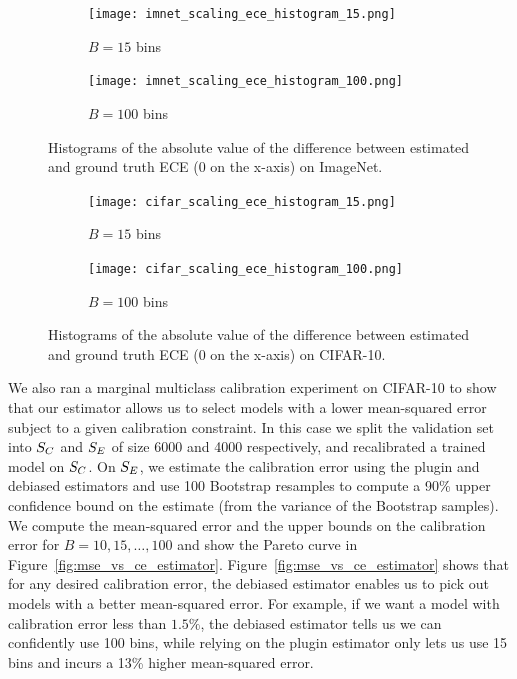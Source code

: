 \begin{figure}
  \centering
  \centering
     \begin{subfigure}[b]{0.45\textwidth}
         \centering
         \texttt{[image: imnet\_scaling\_ece\_histogram\_15.png]}
         \caption{$B = 15$ bins}
     \end{subfigure}
     \hfill
     \begin{subfigure}[b]{0.45\textwidth}
         \centering
         \texttt{[image: imnet\_scaling\_ece\_histogram\_100.png]}
         \caption{$B = 100$ bins}
     \end{subfigure}
  \caption{Histograms of the absolute value of the difference between estimated and ground truth ECE ($0$ on the x-axis) on ImageNet.}
  \label{fig:histograms_estimators_ece_imagenet_bins}
\end{figure}

\begin{figure}
  \centering
  \centering
     \begin{subfigure}[b]{0.45\textwidth}
         \centering
         \texttt{[image: cifar\_scaling\_ece\_histogram\_15.png]}
         \caption{$B = 15$ bins}
     \end{subfigure}
     \hfill
     \begin{subfigure}[b]{0.45\textwidth}
         \centering
         \texttt{[image: cifar\_scaling\_ece\_histogram\_100.png]}
         \caption{$B = 100$ bins}
     \end{subfigure}
  \caption{Histograms of the absolute value of the difference between estimated and ground truth ECE ($0$ on the x-axis) on CIFAR-10.}
  \label{fig:histograms_estimators_ece_cifar_10_bins}
\end{figure}

We also ran a marginal multiclass calibration experiment on CIFAR-10 to show that our estimator allows us to select models with a lower mean-squared error subject to a given calibration constraint. In this case we split the validation set into $S_C{}$ and $S_E{}$ of size 6000 and 4000 respectively, and recalibrated a trained model on $S_C{}$. On $S_E{}$, we estimate the calibration error using the plugin and debiased estimators and use 100 Bootstrap resamples to compute a 90\% upper confidence bound on the estimate (from the variance of the Bootstrap samples). We compute the mean-squared error and the upper bounds on the calibration error for $B = 10, 15, \dots, 100$ and show the Pareto curve in Figure~\ref{fig:mse_vs_ce_estimator}. Figure~\ref{fig:mse_vs_ce_estimator} shows that for any desired calibration error, the debiased estimator enables us to pick out models with a better mean-squared error. For example, if we want a model with calibration error less than $1.5\%$, the debiased estimator tells us we can confidently use 100 bins, while relying on the plugin estimator only lets us use 15 bins and incurs a 13\% higher mean-squared error.

